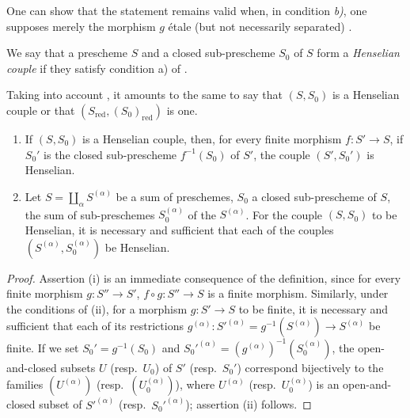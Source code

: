 \begin{remark}[18.5.4.4]
\label{IV.18.5.4.4}
One can show that the statement  remains valid when, in condition \emph{b)}, one supposes merely the morphism $g$ \'etale (but not necessarily separated) \cite[exp.~XII]{IV-43}.
\end{remark}

\begin{definition}[18.5.5]
\label{IV.18.5.5}
We say that a prescheme $S$ and a closed sub-prescheme $S_0$ of $S$ form a \emph{Henselian couple} if they satisfy condition \textup{a)} of .
\end{definition}

Taking into account , it amounts to the same to say that $(S,S_0)$ is a Henselian couple or that $(S_{\mathrm{red}},(S_0)_{\mathrm{red}})$ is one.

\begin{proposition}[18.5.6]
\label{IV.18.5.6}
\begin{enumerate}
  \item[\textup{(i)}] If $(S,S_0)$ is a Henselian couple, then, for every finite morphism $f:S'\to S$, if $S_0'$ is the closed sub-prescheme $f^{-1}(S_0)$ of $S'$, the couple $(S',S_0')$ is Henselian.
  \item[\textup{(ii)}] Let $S=\coprod_\alpha S^{(\alpha)}$ be a sum of preschemes, $S_0$ a closed sub-prescheme of $S$, the sum of sub-preschemes $S_0^{(\alpha)}$ of the $S^{(\alpha)}$.
For the couple $(S,S_0)$ to be Henselian, it is necessary and sufficient that each of the couples $(S^{(\alpha)},S_0^{(\alpha)})$ be Henselian.
\end{enumerate}
\end{proposition}

\begin{proof}
Assertion (i) is an immediate consequence of the definition, since for every finite morphism $g:S''\to S'$, $f\circ g:S''\to S$ is a finite morphism.
Similarly, under the conditions of (ii), for a morphism $g:S'\to S$ to be finite, it is necessary and sufficient that each of its restrictions $g^{(\alpha)}:S'^{(\alpha)}=g^{-1}(S^{(\alpha)})\to S^{(\alpha)}$ be finite.
If we set $S_0'=g^{-1}(S_0)$ and $S_0'^{(\alpha)}=(g^{(\alpha)})^{-1}(S_0^{(\alpha)})$, the open-and-closed subsets $U$ (resp.\ $U_0$) of $S'$ (resp.\ $S_0'$) correspond bijectively to the families $(U^{(\alpha)})$ (resp.\ $(U_0^{(\alpha)})$), where $U^{(\alpha)}$ (resp.\ $U_0^{(\alpha)}$) is an open-and-closed subset of $S'^{(\alpha)}$ (resp.\ $S_0'^{(\alpha)}$); assertion (ii) follows.
\end{proof}

